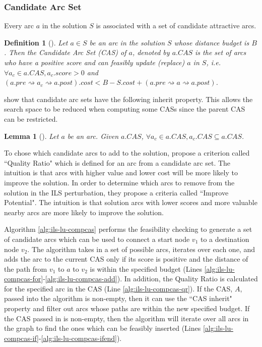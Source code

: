 \documentclass[honors]{union-cs-thesis}
\newtheorem{lemma}{Lemma}
\newtheorem{definition}{Definition}
\newcommand{\sse}{\subseteq} %
\newcommand{\spa}{\rightsquigarrow}
\begin{document}
\subsubsection{Candidate Arc Set}
Every arc $a$ in the solution $S$ is associated with a set of candidate attractive arcs. 
%
%
\begin{definition}[\cite{lu2015arc}]
    Let $a \in S$ be an arc in the solution $S$ whose distance budget is $B$. Then the Candidate Arc Set (CAS) of $a$, denoted by $a.CAS$ is the set of arcs who have a positive score and can feasibly update (replace) $a$ in $S$, i.e. $\forall a_c \in a.CAS, a_c.score > 0$ and $(a.pre \spa a_c \spa a.post).cost < B - S.cost + (a.pre \spa a \spa a.post)$.
\end{definition}

\citeauthor{lu2015arc} show that candidate arc sets have the following inherit property. This allows the search space to be reduced when computing some CASs since the parent CAS can be restricted.
\begin{lemma}[\cite{lu2015arc}] Let $a$ be an arc. Given $a.CAS$, $\forall a_c \in a.CAS, a_c.CAS \sse a.CAS$.
\end{lemma}

To chose which candidate arcs to add to the solution, \citeauthor{lu2015arc} propose a criterion called ``Quality Ratio" which is defined for an arc from a candidate arc set. The intuition is that arcs with higher value and lower cost will be more likely to improve the solution. In order to determine which arcs to remove from the solution in the ILS perturbation, they propose a criteria called ``Improve Potential". The intuition is that solution arcs with lower scores and more valuable nearby arcs are more likely to improve the solution.

Algorithm \ref{alg:ils-lu-compcas} performs the feasibility checking to generate a set of candidate arcs which can be used to connect a start node $v_1$ to a destination node $v_2$. The algorithm takes in a set of possible arcs, iterates over each one, and adds the arc to the current CAS only if its score is positive and the distance of the path from $v_1$ to $a$ to $v_2$ is within the specified budget (Lines \ref{alg:ils-lu-compcas-for}-\ref{alg:ils-lu-compcas-add}). In addition, the Quality Ratio is calculated for the specified arc in the CAS (Line \ref{alg:ils-lu-compcas-qr}). If the CAS, $A$, passed into the algorithm is non-empty, then it can use the ``CAS inherit" property and filter out arcs whose paths are within the new specified budget. If the CAS passed in is non-empty, then the algorithm will iterate over all arcs in the graph to find the ones which can be feasibly inserted (Lines \ref{alg:ils-lu-compcas-if}-\ref{alg:ils-lu-compcas-ifend}).
\end{document}
